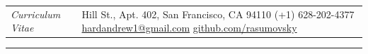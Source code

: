 \documentclass{letter}
\begin{document}

\begin{tabular}{p{}p{}}
  \hfill \newline \href{https://ch.linkedin.com/in/andrew-hard-25b690a5}{\Huge{\color{Maroon}{Andrew Hard}}}
  \newline \LARGE{\textit{Curriculum Vitae}} \newline
  &
  \hfill \newline 1 Hill St., Apt. 402, San Francisco, CA 94110 \newline
  (+1) 628-202-4377 \newline
  \href{mailto:hardandrew1@gmail.com}{hardandrew1@gmail.com} \newline
  \href{https://github.com/rasumovsky}{github.com/rasumovsky}\\
\end{tabular}



\begin{flushleft}
  \Large{\textsc{\textbf{\color{Maroon}{Experience}}}}
  \vspace{1pt}  %
  \hrule
\end{flushleft}
\end{document}
